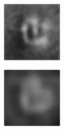 \begin{figure}[H]
\begin{subfigure}[t]{0.15\textwidth}
  \end{subfigure}
  \begin{subfigure}[t]{0.15\textwidth}
    \includegraphics[width=\linewidth]{img/one-trial/prediction_2_cnnv3.png}
  \end{subfigure}
  \begin{subfigure}[t]{0.15\textwidth}
    \includegraphics[width=\linewidth]{img/one-trial/prediction_2_cnnv4.png}
  \end{subfigure}
  \\
    \vspace{0.1cm}
  

\end{figure}
